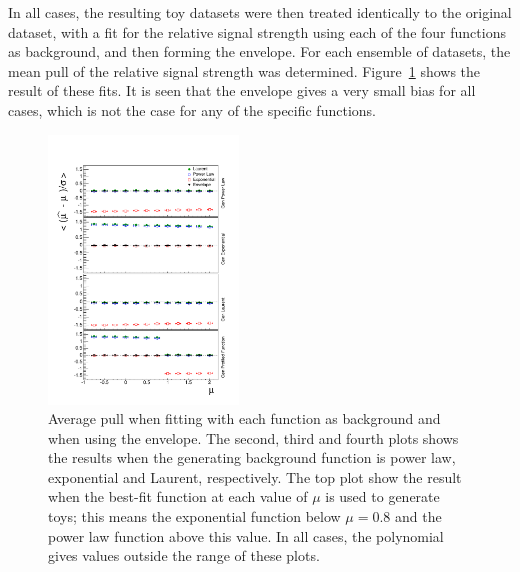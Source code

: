 In all cases, the resulting toy datasets were then treated identically to the
original dataset, with a fit for the relative signal strength using
each of the four functions as background, and then forming the envelope.
For each ensemble of datasets, the mean pull of the relative
signal strength was determined. Figure~\ref{fig:functions:firstorderbias}
shows the result of these fits. It is seen that the envelope gives a very small
bias for all cases, which is not the case for any of the specific functions.
%
\begin{figure}[tbp]
\centering
\includegraphics[width=0.45\textwidth]{functions/FirstOrderFunctions.pdf}
\caption{Average pull when fitting with each function as background and when
using the envelope. The second, third and fourth plots shows the results
when the generating background function is power law, exponential and Laurent,
respectively. The top plot show the result when the best-fit function at each
value of $\mu$ is used to generate toys; this means the exponential function
below $\mu = 0.8$ and the power law function above this value. In all cases,
the polynomial gives values outside the range of these plots.}
\label{fig:functions:firstorderbias}
\end{figure}

